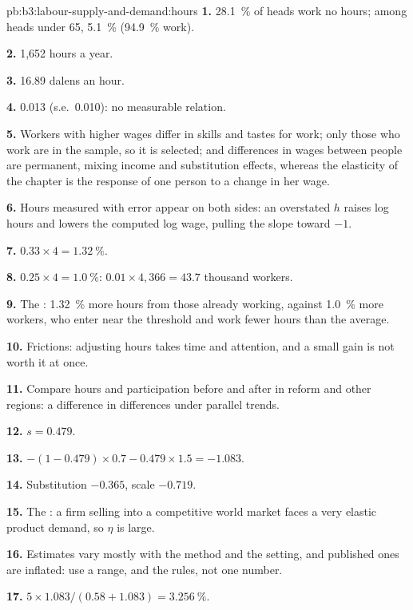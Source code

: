 \begin{solution}{pb:b3:labour-supply-and-demand:hours}
\textbf{1.} 28.1~\% of heads work no hours; among heads under 65, 5.1~\% (94.9~\% work).

\textbf{2.} 1{,}652 hours a year.

\textbf{3.} 16.89 dalens an hour.

\textbf{4.} 0.013 (s.e.\ 0.010): no measurable relation.

\textbf{5.} Workers with higher wages differ in skills and tastes for work; only those
who work are in the sample, so it is selected; and differences in wages between
people are permanent, mixing income and substitution effects, whereas the
elasticity of the chapter is the response of one person to a change in her wage.

\textbf{6.} Hours measured with error appear on both sides: an overstated $h$ raises log
hours and lowers the computed log wage, pulling the slope toward $-1$.

\textbf{7.} $0.33 \times 4 = 1.32~\%$.

\textbf{8.} $0.25 \times 4 = 1.0~\%$: $0.01 \times 4{,}366 = 43.7$ thousand workers.

\textbf{9.} The : 1.32~\% more hours from those already working, against
1.0~\% more workers, who enter near the threshold and work fewer hours than the
average.

\textbf{10.} Frictions: adjusting hours takes time and attention, and a small gain is not
worth it at once.

\textbf{11.} Compare hours and participation before and after in reform and other
regions: a difference in differences under parallel trends.

\textbf{12.} $s = 0.479$.

\textbf{13.} $-(1 - 0.479) \times 0.7 - 0.479 \times 1.5 = -1.083$.

\textbf{14.} Substitution $-0.365$, scale $-0.719$.

\textbf{15.} The : a firm selling into a competitive world market faces a
very elastic product demand, so $\eta$ is large.

\textbf{16.} Estimates vary mostly with the method and the setting, and published ones
are inflated: use a range, and the rules, not one number.

\textbf{17.} $5 \times 1.083/(0.58 + 1.083) = 3.256~\%$.


\end{solution}
